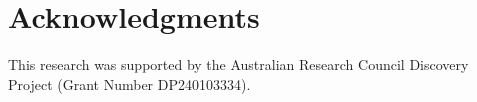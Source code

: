 \section*{Acknowledgments}
This research was supported by the Australian Research Council Discovery Project (Grant Number DP240103334).
 
